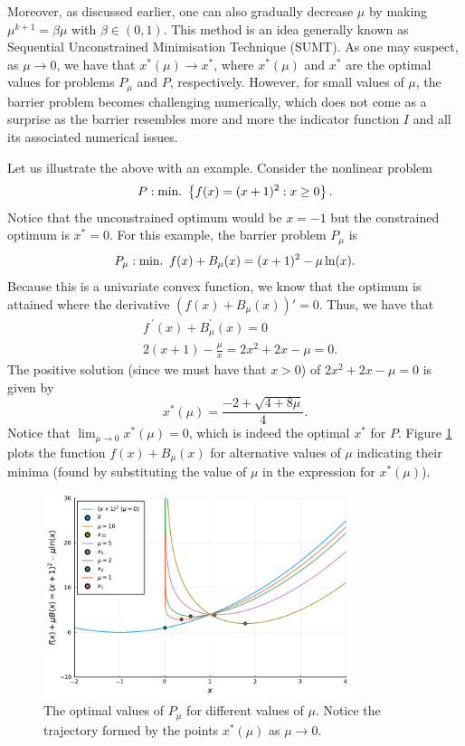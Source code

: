 Moreover, as discussed earlier, one can also gradually decrease $\mu$ by making $\mu^{k+1} = \beta\mu$ with $\beta \in (0,1)$. This method is an idea generally known as Sequential Unconstrained Minimisation Technique (SUMT). As one may suspect, as $\mu \rightarrow 0$, we have that $x^*(\mu) \rightarrow x^*$, where $x^*(\mu)$ and $x^*$ are the optimal values for problems $P_\mu$ and $P$, respectively. However, for small values of $\mu$, the barrier problem becomes challenging numerically, which does not come as a surprise as the barrier resembles more and more the indicator function $I$ and all its associated numerical issues. 

Let us illustrate the above with an example. Consider the nonlinear problem 
	$$
	P : \mathop{\text{min.~}} \left\{ f(x) = (x + 1)^2 : x \geq 0 \right \}.
	$$ 
	Notice that the unconstrained optimum would be $x =-1$ but the constrained optimum is $x^* = 0$. For this example, the barrier problem $P_\mu$ is
	$$P_\mu : \mathop{\text{min.~}} f(x) + B_\mu(x) = (x + 1)^2 - \mu \ln(x).$$
	Because this is a univariate convex function, we know that the optimum is attained where the derivative $(f(x) + B_\mu(x))' = 0$. Thus, we have that
	\begin{align*}
		& f^{~\prime}(x) + B_\mu^\prime(x) = 0 \\
		& 2(x+1) - \frac{\mu}{x} = 2x^2 + 2x -\mu = 0.
	\end{align*}
	The positive solution (since we must have that $x > 0$) of $2x^2 + 2x -\mu = 0$ is given by
	$$ x^*(\mu) = \frac{-2 + \sqrt{4 + 8\mu}}{4}.  
	$$ 
	Notice that $\lim_{\mu \rightarrow 0}x^*(\mu) = 0$, which is indeed the optimal $x^*$ for $P$. Figure \ref{p1c7:fig:example-barrier} plots the function $f(x) + B_\mu(x)$ for alternative values of $\mu$ indicating their minima (found by substituting the value of $\mu$ in the expression for $x^*(\mu)$). 

\begin{figure}
	\includegraphics[width=0.8\textwidth]{part_1/chapter_7/figures/ex-barrier.pdf}
	\caption{The optimal values of $P_\mu$ for different values of $\mu$. Notice the trajectory formed by the points $x^*(\mu)$ as $\mu \to 0$.} \label{p1c7:fig:example-barrier} 	
\end{figure}


